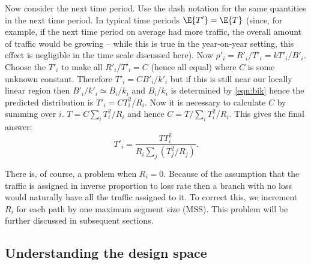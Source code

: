 Now consider the next time period.  
Use the dash notation for the same quantities in the next time period.  
In typical time periods $\E{T'} = \E{T}$ (since, for example, if the next time period on average had more traffic, the overall amount of traffic would be growing -- while this is true in the year-on-year setting, this effect is negligible in the time scale discussed here). 
Now $\rho'_i = R'_i/T'_i = k T'_i/B'_i$.  
Choose the $T'_i$ to make all $R'_i/T'_i = C$ (hence all equal) where $C$ is some unknown constant.  
Therefore $T'_i = C B'_i/k'_i$ but if this is still near our locally linear region then $B'_i/k'_i \simeq B_i/k_i$ and $B_i/k_i$ is determined by \eqref{eqn:bik} hence the predicted distribution is $ T'_i = C T_i^2/R_i$.  
Now it is necessary to calculate $C$ by summing over $i$.  
$T = C \sum_i T_i^2/R_i$ and hence $C = T/\sum_i T_i^2/R_i$.
This gives the final answer:
\begin{equation}
T'_i = \frac{T T_i^2}{R_i \sum_j (T_j^2/R_j)}.
\label{eqn:routesplitloss}
\end{equation}

There is, of course, a problem when $R_i = 0$.  
Because of the assumption that the traffic is assigned in inverse proportion to loss rate then a branch with no loss would naturally have all the traffic assigned to it. To correct this, we increment $R_i$ for each path by one maximum segment size (MSS). 
This problem will be further discussed in subsequent sections.

\subsection{Understanding the design space}

